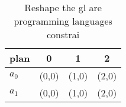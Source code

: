 \documentclass[a4paper]{article}
\begin{document}
\begin{table}
\begin{adjustbox}{width=0.6\columnwidth}
\begin{tabular}{|l|l|l|l|}
\hline
\textbf{plan} & \multicolumn{1}{c|}{\textbf{0}} & \multicolumn{1}{c|}{\textbf{1}} & \multicolumn{1}{c|}{\textbf{2}} \\ \hline
\textbf{$a_0$}  & (0,0) & (1,0) & (2,0) \\ \hline
\textbf{$a_1$}  & (0,0) & (1,0) & (2,0) \\ \hline
\end{tabular}
\end{adjustbox}
\caption{Reshape the gl are programming languages constrai
}
\end{table}
\end{document}
